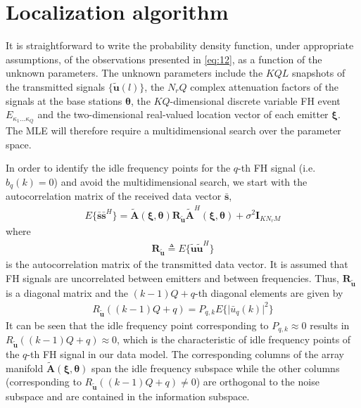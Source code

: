\documentclass[journal,10pt]{IEEEtran}
\begin{document}
\section{Localization algorithm}
It is straightforward to write the probability density function, under appropriate assumptions, of the observations presented in \eqref{eq:12}, as a function of the unknown parameters.
The unknown parameters include the $KQL$ snapshots of the transmitted signals $\{\tilde{\boldsymbol{u}}(l)\}$, the $N_rQ$ complex attenuation factors of the signals at the base stations $\boldsymbol{\theta}$, 
the $KQ$-dimensional discrete variable FH event $E_{\kappa_1\dots\kappa_Q}$ and the two-dimensional real-valued location vector of each emitter $\boldsymbol{\xi}$. The MLE will therefore require a multidimensional search over the parameter space.

In order to identify the idle frequency points for the $q$-th FH signal (i.e. $b_q(k)=0$) and avoid the multidimensional search, we start with the autocorrelation matrix of the received data vector $\bar{\boldsymbol{s}}$,
\begin{align}\label{eq:13}
    E\{\bar{\boldsymbol{s}}\bar{\boldsymbol{s}}^H\}=\tilde{\boldsymbol{A}}(\boldsymbol{\xi},\boldsymbol{\theta})\boldsymbol{R}_{\tilde{\boldsymbol{u}}}\tilde{\boldsymbol{A}}^H(\boldsymbol{\xi},\boldsymbol{\theta})+\sigma^2\boldsymbol{I}_{KN_rM}
\end{align}
where 
\begin{align}\label{eq:14}
    \boldsymbol{R}_{\tilde{\boldsymbol{u}}}\triangleq E\{\tilde{\boldsymbol{u}}\tilde{\boldsymbol{u}}^H\}
\end{align}
is the autocorrelation matrix of the transmitted data vector. It is assumed that FH signals are uncorrelated between emitters and between frequencies. 
Thus, $\boldsymbol{R}_{\tilde{\boldsymbol{u}}}$ is a diagonal matrix and the $(k-1)Q+q$-th diagonal elements are given by
\begin{align}\label{eq:15}
    R_{\tilde{\boldsymbol{u}}}((k-1)Q+q)=P_{q,k}E\{\vert\bar{u}_q(k)\vert^2\}
\end{align}
It can be seen that the idle frequency point corresponding to $P_{q,k}\approx 0$ results in $R_{\tilde{\boldsymbol{u}}}((k-1)Q+q)\approx 0$, which is the characteristic of idle frequency points of the $q$-th FH signal in our data model.
The corresponding columns of the array manifold $\tilde{\boldsymbol{A}}(\boldsymbol{\xi},\boldsymbol{\theta})$ span the idle frequency subspace 
while the other columns (corresponding to $R_{\tilde{\boldsymbol{u}}}((k-1)Q+q)\neq 0$) are orthogonal to the noise subspace and are contained in the information subspace.
\end{document}
